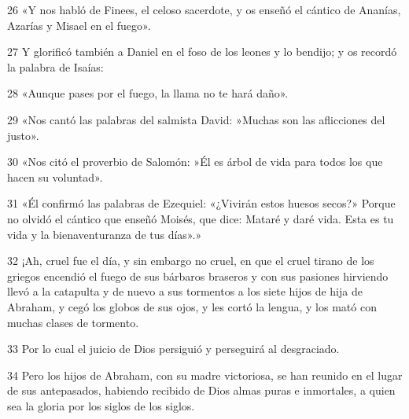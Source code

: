 \par 26 «Y nos habló de Finees, el celoso sacerdote, y os enseñó el cántico de Ananías, Azarías y Misael en el fuego».

\par 27 Y glorificó también a Daniel en el foso de los leones y lo bendijo; y os recordó la palabra de Isaías:

\par 28 «Aunque pases por el fuego, la llama no te hará daño».

\par 29 «Nos cantó las palabras del salmista David: »Muchas son las aflicciones del justo».

\par 30 «Nos citó el proverbio de Salomón: »Él es árbol de vida para todos los que hacen su voluntad».

\par 31 «Él confirmó las palabras de Ezequiel: «¿Vivirán estos huesos secos?» Porque no olvidó el cántico que enseñó Moisés, que dice: Mataré y daré vida. Esta es tu vida y la bienaventuranza de tus días».»

\par 32 ¡Ah, cruel fue el día, y sin embargo no cruel, en que el cruel tirano de los griegos encendió el fuego de sus bárbaros braseros y con sus pasiones hirviendo llevó a la catapulta y de nuevo a sus tormentos a los siete hijos de hija de Abraham, y cegó los globos de sus ojos, y les cortó la lengua, y los mató con muchas clases de tormento.

\par 33 Por lo cual el juicio de Dios persiguió y perseguirá al desgraciado.

\par 34 Pero los hijos de Abraham, con su madre victoriosa, se han reunido en el lugar de sus antepasados, habiendo recibido de Dios almas puras e inmortales, a quien sea la gloria por los siglos de los siglos.


